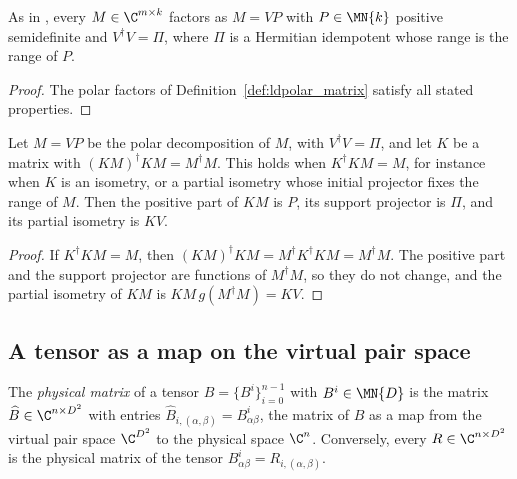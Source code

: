 \begin{lemma}
    \label{thm:ldpolar_exists}
    \leanok
    As in \cite[Supplemental Material]{Malz2024Preparation}, every
    $M\in\C^{m\times k}$ factors as $M=VP$ with $P\in\MN{k}$ positive
    semidefinite and $V^\dagger V=\Pi$, where $\Pi$ is a Hermitian
    idempotent whose range is the range of $P$.
\end{lemma}
\begin{proof}
    \leanok
    The polar factors of Definition~\ref{def:ldpolar_matrix} satisfy all
    stated properties.
\end{proof}

\begin{lemma}
    \label{thm:ldpolar_left_product}
    \leanok
    Let $M=VP$ be the polar decomposition of $M$, with $V^\dagger V=\Pi$, and
    let $K$ be a matrix with $(KM)^\dagger KM=M^\dagger M$. This holds when
    $K^\dagger KM=M$, for instance when $K$ is an isometry, or a partial
    isometry whose initial projector fixes the range of $M$. Then the positive
    part of $KM$ is $P$, its support projector is $\Pi$, and its partial
    isometry is $KV$.
\end{lemma}
\begin{proof}
    \leanok
    If $K^\dagger KM=M$, then $(KM)^\dagger KM=M^\dagger K^\dagger KM=M^\dagger M$.
    The positive part and the support projector are functions of
    $M^\dagger M$, so they do not change, and the partial isometry of $KM$ is
    $KM\,g(M^\dagger M)=KV$.
\end{proof}

\subsection{A tensor as a map on the virtual pair space}

\begin{definition}
    \label{def:ldpolar_physical_matrix}
    \leanok
    The \emph{physical matrix} of a tensor $B=\{B^i\}_{i=0}^{n-1}$ with
    $B^i\in\MN{D}$ is the matrix $\widehat B\in\C^{n\times D^2}$ with entries
    $\widehat B_{i,(\alpha,\beta)}=B^i_{\alpha\beta}$, the matrix of $B$ as a
    map from the virtual pair space $\C^{D^2}$ to the physical space
    $\C^n$. Conversely, every $R\in\C^{n\times D^2}$ is the physical matrix
    of the tensor $B^i_{\alpha\beta}=R_{i,(\alpha,\beta)}$.
\end{definition}


